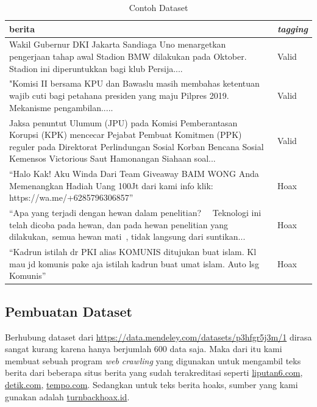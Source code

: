 \begin{table}
    \caption{Contoh Dataset}
    \label{tab:contoh_dataset}
    \centering
    \begin{tabular}{ | p{.8\linewidth} | l | }
        \hline
        \textbf{berita}                                                                                                                                                                                                                   & \textbf{\textit{tagging}} \\ \hline
        Wakil Gubernur DKI Jakarta Sandiaga Uno menargetkan pengerjaan tahap awal Stadion BMW dilakukan pada Oktober. Stadion ini diperuntukkan bagi klub Persija....                                                                     & Valid                     \\ \hline
        "Komisi II bersama KPU dan Bawaslu masih membahas ketentuan wajib cuti bagi petahana presiden yang maju Pilpres 2019. Mekanisme pengambilan.....                                                                                  & Valid                     \\ \hline
        Jaksa penuntut Ulumum (JPU) pada Komisi Pemberantasan Korupsi (KPK) mencecar Pejabat Pembuat Komitmen (PPK) reguler pada Direktorat Perlindungan Sosial Korban Bencana Sosial Kemensos Victorious Saut Hamonangan Siahaan soal... & Valid                     \\ \hline
        “Halo Kak! Aku Winda Dari Team Giveaway BAIM WONG Anda Memenangkan Hadiah Uang 100Jt dari kami info klik: https://wa.me/+6285796306857”                                                                                           & Hoax                      \\ \hline
        “Apa yang terjadi dengan hewan dalam penelitian?   Teknologi ini telah dicoba pada hewan, dan pada hewan penelitian yang dilakukan, semua hewan mati , tidak langsung dari suntikan...                                            & Hoax                      \\ \hline
        “Kadrun istilah dr PKI alias KOMUNIS ditujukan buat islam. Kl mau jd komunis pake aja istilah kadrun buat umat islam. Auto lsg Komunis”                                                                                           & Hoax                      \\ \hline
    \end{tabular}
\end{table}

\subsection{Pembuatan Dataset}
Berhubung dataset dari \url{https://data.mendeley.com/datasets/p3hfgr5j3m/1} dirasa sangat kurang karena hanya berjumlah 600 data saja. Maka dari itu kami membuat sebuah program \textit{web crawling} yang digunakan untuk mengambil teks berita dari beberapa situs berita yang sudah terakreditasi seperti \url{liputan6.com}, \url{detik.com}, \url{tempo.com}. Sedangkan untuk teks berita hoaks, sumber yang kami gunakan adalah \url{turnbackhoax.id}.

